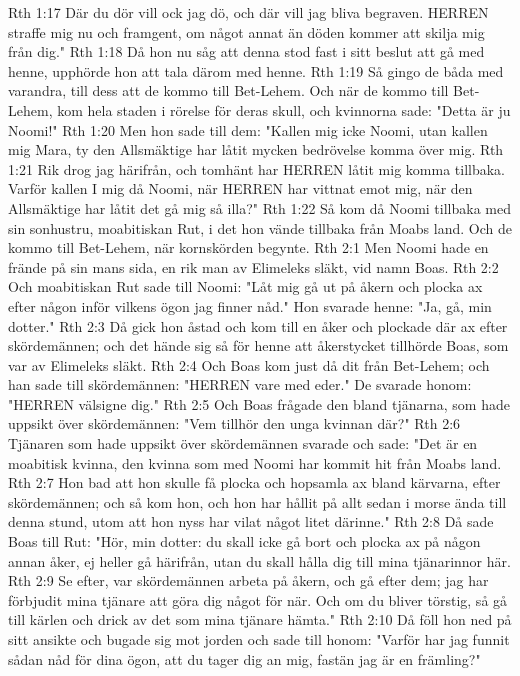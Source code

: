 Rth 1:17  Där du dör vill ock jag dö, och där vill jag bliva begraven. HERREN straffe mig nu och framgent, om något annat än döden kommer att skilja mig från dig."
Rth 1:18  Då hon nu såg att denna stod fast i sitt beslut att gå med henne, upphörde hon att tala därom med henne.
Rth 1:19  Så gingo de båda med varandra, till dess att de kommo till Bet-Lehem. Och när de kommo till Bet-Lehem, kom hela staden i rörelse för deras skull, och kvinnorna sade: "Detta är ju Noomi!"
Rth 1:20  Men hon sade till dem: "Kallen mig icke Noomi, utan kallen mig Mara, ty den Allsmäktige har låtit mycken bedrövelse komma över mig.
Rth 1:21  Rik drog jag härifrån, och tomhänt har HERREN låtit mig komma tillbaka. Varför kallen I mig då Noomi, när HERREN har vittnat emot mig, när den Allsmäktige har låtit det gå mig så illa?"
Rth 1:22  Så kom då Noomi tillbaka med sin sonhustru, moabitiskan Rut, i det hon vände tillbaka från Moabs land. Och de kommo till Bet-Lehem, när kornskörden begynte.
Rth 2:1  Men Noomi hade en frände på sin mans sida, en rik man av Elimeleks släkt, vid namn Boas.
Rth 2:2  Och moabitiskan Rut sade till Noomi: "Låt mig gå ut på åkern och plocka ax efter någon inför vilkens ögon jag finner nåd." Hon svarade henne: "Ja, gå, min dotter."
Rth 2:3  Då gick hon åstad och kom till en åker och plockade där ax efter skördemännen; och det hände sig så för henne att åkerstycket tillhörde Boas, som var av Elimeleks släkt.
Rth 2:4  Och Boas kom just då dit från Bet-Lehem; och han sade till skördemännen: "HERREN vare med eder." De svarade honom: "HERREN välsigne dig."
Rth 2:5  Och Boas frågade den bland tjänarna, som hade uppsikt över skördemännen: "Vem tillhör den unga kvinnan där?"
Rth 2:6  Tjänaren som hade uppsikt över skördemännen svarade och sade: "Det är en moabitisk kvinna, den kvinna som med Noomi har kommit hit från Moabs land.
Rth 2:7  Hon bad att hon skulle få plocka och hopsamla ax bland kärvarna, efter skördemännen; och så kom hon, och hon har hållit på allt sedan i morse ända till denna stund, utom att hon nyss har vilat något litet därinne."
Rth 2:8  Då sade Boas till Rut: "Hör, min dotter: du skall icke gå bort och plocka ax på någon annan åker, ej heller gå härifrån, utan du skall hålla dig till mina tjänarinnor här.
Rth 2:9  Se efter, var skördemännen arbeta på åkern, och gå efter dem; jag har förbjudit mina tjänare att göra dig något för när. Och om du bliver törstig, så gå till kärlen och drick av det som mina tjänare hämta."
Rth 2:10  Då föll hon ned på sitt ansikte och bugade sig mot jorden och sade till honom: "Varför har jag funnit sådan nåd för dina ögon, att du tager dig an mig, fastän jag är en främling?"
